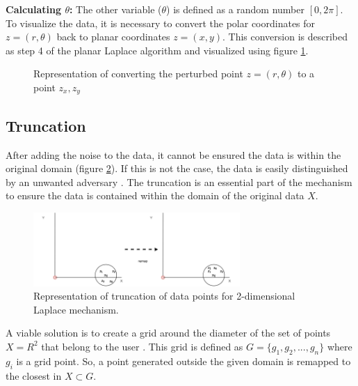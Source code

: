 \textbf{Calculating $\theta$:}
The other variable ($\theta$) is defined as a random number $[0, 2\pi]$. \newline
To visualize the data, it is necessary to convert the polar coordinates for $z = (r, \theta)$ back to planar coordinates $z = (x, y)$.
This conversion is described as step 4 of the planar Laplace algorithm \citep{DBLP:journals/corr/abs-1212-1984} and visualized using figure \ref{figure:geo}.
\begin{figure}[h]
  
  \centering
  \caption{Representation of converting the perturbed point $z = (r, \theta)$ to a point ${z_x, z_y}$}
  \label{figure:geo}
\end{figure}

\newpage
\subsection{Truncation} \label{theory:truncation}
After adding the noise to the data, it cannot be ensured the data is within the original domain (figure \ref{figure:truncation-2d}).
If this is not the case, the data is easily distinguished by an unwanted adversary \citep{DBLP:journals/corr/abs-1212-1984,9646489}.
The truncation is an essential part of the mechanism to ensure the data is contained within the domain of the original data $X$.
\begin{figure}[ht]
  \includegraphics[width=0.7\textwidth]{TheorethicalFramework/ND-Laplace/Images/remapping.png}
  \caption{Representation of truncation of data points for 2-dimensional Laplace mechanism.}
  \label{figure:truncation-2d}
\end{figure}
A viable solution is to create a grid around the diameter of the set of points $X = R^2$ that belong to the user \citep{DBLP:journals/corr/abs-1212-1984}.
This grid is defined as $G = \{g_1, g_2, ..., g_n\}$ where $g_i$ is a grid point.
So, a point generated outside the given domain is remapped to the closest in $X \subset G$.

